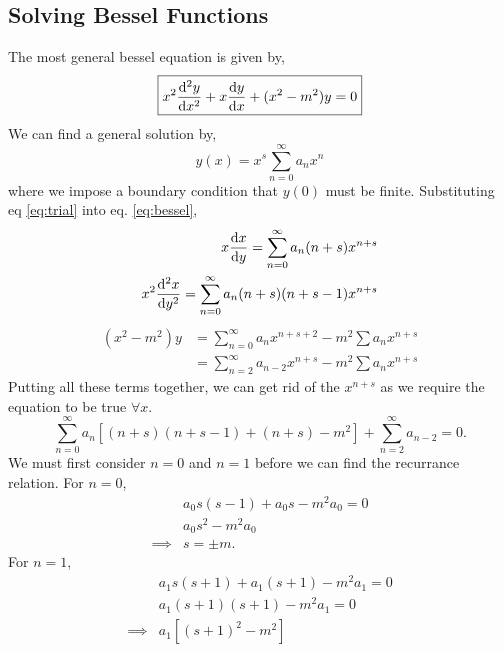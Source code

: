 \documentclass{book}
\begin{document}
\subsection{Solving Bessel Functions}
The most general bessel equation is given by,
\begin{equation}
	\boxed{x^2\dv[2]{y}{x} + x\dv{y}{x} + (x^2 - m^2)y = 0} \label{eq:bessel}
\end{equation}
We can find a general solution by,
\begin{equation}
	y(x) = x^s\sum_{n=0}^{\infty}a_nx^n \label{eq:trial}
\end{equation}
where we impose a boundary condition that $y(0)$ must be finite. Substituting eq \eqref{eq:trial} into eq. \eqref{eq:bessel},
\begin{align}
	x\dv{x}{y} = \sum_{n=0}^{\infty}a_n(n+s)x^{n+s} \\
	x^2\dv[2]{x}{y} = \sum_{n=0}^{\infty}a_n(n+s)(n+s-1)x^{n+s} \\
\end{align}
\begin{equation}
	\begin{split}
		(x^2 - m^2)y & = \sum_{n=0}^{\infty}a_nx^{n+s+2} - m^2\sum a_n x^{n+s} \\
		& = \sum_{n=2}^{\infty}a_{n-2}x^{n+s} - m^2\sum a_n x^{n+s}
	\end{split}
\end{equation}
Putting all these terms together, we can get rid of the $x^{n+s}$ as we require the equation to be true $\forall x$.
\begin{equation}
	\sum_{n=0}^{\infty}a_n\left[(n+s)(n+s-1) + (n+s) - m^2\right] + \sum_{n=2}^{\infty}a_{n-2} = 0.
\end{equation}
We must first consider $n=0$ and $n=1$ before we can find the recurrance relation. For $n=0$,
\begin{equation}
	\begin{split}
		& a_0s(s-1) + a_0s - m^2a_0 = 0 \\
		& a_0s^2 - m^2 a_0 \\
		\implies & s = \pm m.
	\end{split}
\end{equation}
For $n=1$,
\begin{equation}
	\begin{split}
		& a_1s(s+1) + a_1(s+1) - m^2a_1 = 0 \\
		& a_1 (s+1)(s+1) - m^2a_1 = 0 \\
		\implies & a_1\left[(s+1)^2 - m^2\right]
	\end{split}
\end{equation}
\end{document}
